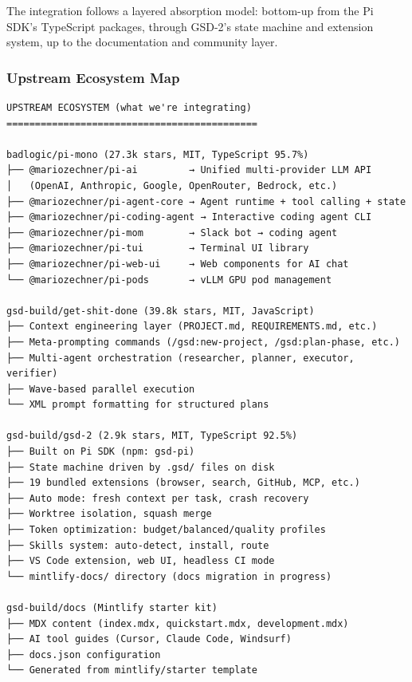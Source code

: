 \documentclass[11pt,letterpaper]{article}
\begin{document}
The integration follows a layered absorption model: bottom-up from the Pi SDK's TypeScript packages, through GSD-2's state machine and extension system, up to the documentation and community layer.

\subsubsection{Upstream Ecosystem Map}

\begin{asciibox}
\begin{verbatim}
UPSTREAM ECOSYSTEM (what we're integrating)
============================================

badlogic/pi-mono (27.3k stars, MIT, TypeScript 95.7%)
├── @mariozechner/pi-ai         → Unified multi-provider LLM API
│   (OpenAI, Anthropic, Google, OpenRouter, Bedrock, etc.)
├── @mariozechner/pi-agent-core → Agent runtime + tool calling + state
├── @mariozechner/pi-coding-agent → Interactive coding agent CLI
├── @mariozechner/pi-mom        → Slack bot → coding agent
├── @mariozechner/pi-tui        → Terminal UI library
├── @mariozechner/pi-web-ui     → Web components for AI chat
└── @mariozechner/pi-pods       → vLLM GPU pod management

gsd-build/get-shit-done (39.8k stars, MIT, JavaScript)
├── Context engineering layer (PROJECT.md, REQUIREMENTS.md, etc.)
├── Meta-prompting commands (/gsd:new-project, /gsd:plan-phase, etc.)
├── Multi-agent orchestration (researcher, planner, executor, verifier)
├── Wave-based parallel execution
└── XML prompt formatting for structured plans

gsd-build/gsd-2 (2.9k stars, MIT, TypeScript 92.5%)
├── Built on Pi SDK (npm: gsd-pi)
├── State machine driven by .gsd/ files on disk
├── 19 bundled extensions (browser, search, GitHub, MCP, etc.)
├── Auto mode: fresh context per task, crash recovery
├── Worktree isolation, squash merge
├── Token optimization: budget/balanced/quality profiles
├── Skills system: auto-detect, install, route
├── VS Code extension, web UI, headless CI mode
└── mintlify-docs/ directory (docs migration in progress)

gsd-build/docs (Mintlify starter kit)
├── MDX content (index.mdx, quickstart.mdx, development.mdx)
├── AI tool guides (Cursor, Claude Code, Windsurf)
├── docs.json configuration
└── Generated from mintlify/starter template
\end{verbatim}
\end{asciibox}
\end{document}
